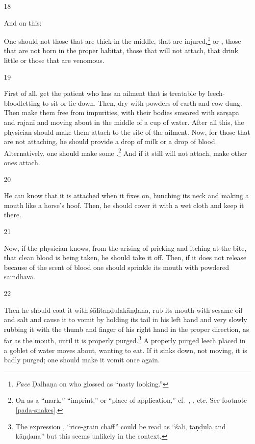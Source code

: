 \begin{translation}
\item[18]

And on this:

\begin{sloka}
    One should not  those that are thick in the middle, that
are injured,\footnote{\emph{Pace} Ḍalhaṇa on  who
    glossed  as “nasty looking.”} or , those
    that are not born in the proper habitat, those that will not attach, that
    drink little or those that are venomous.
\end{sloka}

\item[19] 

First of all, get the patient who has an ailment that is treatable by
leech-bloodletting to sit or lie down.  Then, dry  with powders of earth and cow-dung.  Then make them free from
impurities, with their bodies smeared with \gls{sarṣapa} and \gls{rajanī}
and moving about in the middle of a cup of water. After all this, the
physician should make them attach to the site of the ailment.  Now, for
those that are not attaching, he should provide a drop of milk or a drop of
blood. Alternatively, one should make some .\footnote{\label{pada-leeches}On  as a “mark,”
    “imprint,” or “place of application,” cf.\ ,
    , etc.  See footnote \ref{pada-snakes}.} And if it still
    will not attach, make other ones attach.

\item [20]
 
He can know that it is attached when it fixes on, hunching its neck and
making a mouth like a horse's hoof. Then, he should cover it with a wet
cloth and keep it there.
 
 \item[21]
 
Now, if the physician knows, from the arising of pricking and itching at the
bite, that clean blood is being taken, he should take it off.  Then,
if it does not release because of the scent of blood one should sprinkle its
mouth with powdered \gls{saindhava}.
    
\item[22]

Then he should coat it with \gls{śālitaṇḍulakāṇḍana}, rub its mouth with
sesame oil and salt and cause it to vomit by holding its tail in his left
hand and very slowly rubbing it with the thumb and finger of his right hand
in the proper direction, as far as the mouth, until it is properly purged.\footnote{The 
expression , “rice-grain chaff” could be read as “\gls{śāli}, 
\gls{taṇḍula} and \gls{kāṇḍana}” but this seems unlikely in the context.} 
A properly purged leech placed in a goblet of water moves about, wanting to
eat.  If it sinks down, not moving, it is badly purged; one should make it vomit
once again.  


\end{translation}
